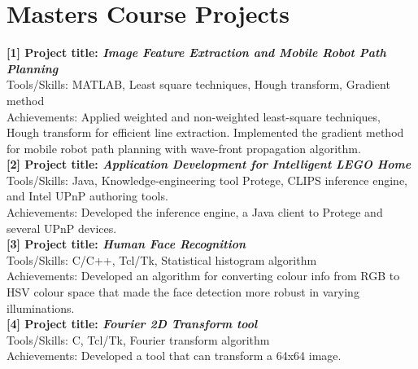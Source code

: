 \documentclass[notopicbreak,contbibnum,plain]{simplecv}
\begin{document}
\section{Masters Course Projects}
\vspace*{-0.3cm}
\textbf{[1] Project title: \textit{Image Feature Extraction and Mobile Robot Path Planning}}\\
Tools/Skills: MATLAB, Least square techniques, Hough transform, Gradient method\\
Achievements: Applied weighted and non-weighted least-square techniques, Hough transform for efficient line extraction. Implemented the gradient method for mobile robot path planning with wave-front propagation algorithm.\\
\textbf{[2] Project title: \textit{Application Development for Intelligent LEGO Home}}\\
Tools/Skills: Java, Knowledge-engineering tool Protege, CLIPS inference engine, and Intel UPnP authoring tools.\\
Achievements: Developed the inference engine, a Java client to Protege and several UPnP devices.\\
\textbf{[3] Project title: \textit{Human Face Recognition}}\\
Tools/Skills: C/C++, Tcl/Tk, Statistical histogram algorithm\\
Achievements: Developed an algorithm for converting colour info from RGB to HSV colour space that made the face detection more robust in varying illuminations.\\
\textbf{[4] Project title: \textit{Fourier 2D Transform tool}}\\
Tools/Skills: C, Tcl/Tk, Fourier transform algorithm\\
Achievements: Developed a tool that can transform a 64x64 image.
\end{document}
